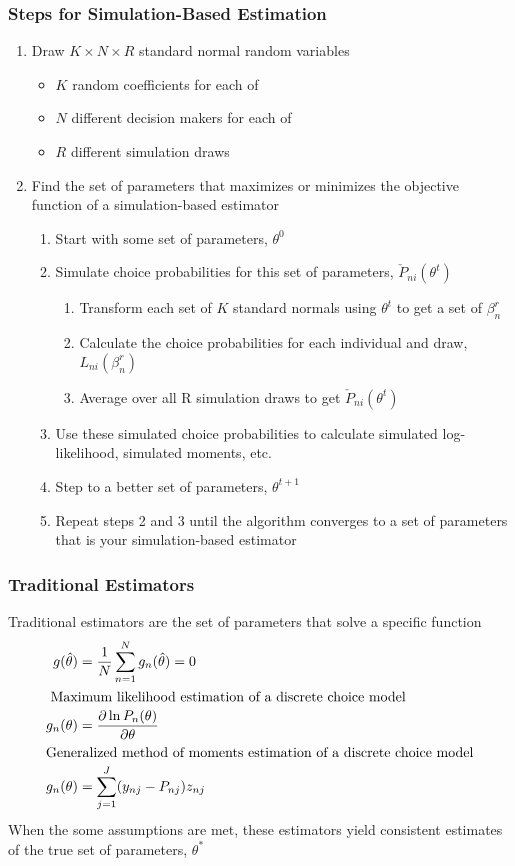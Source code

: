 \documentclass{beamer}
\begin{document}
\begin{frame}\frametitle{Steps for Simulation-Based Estimation}
    \begin{enumerate}
        \item Draw $K \times N \times R$ standard normal random variables
        \begin{itemize}
            \item $K$ random coefficients for each of
            \item $N$ different decision makers for each of
            \item $R$ different simulation draws
        \end{itemize}
        \item Find the set of parameters that maximizes or minimizes the objective function of a simulation-based estimator
        \begin{enumerate}
            \item Start with some set of parameters, $\theta^0$
            \item Simulate choice probabilities for this set of parameters, $\check{P}_{ni}(\theta^t)$
            \begin{enumerate}
                \item Transform each set of $K$ standard normals using $\theta^t$ to get a set of $\beta_n^r$
                \item Calculate the choice probabilities for each individual and draw, $L_{ni}(\beta_n^r)$
                \item Average over all R simulation draws to get $\check{P}_{ni}(\theta^t)$
            \end{enumerate}
            \item Use these simulated choice probabilities to calculate simulated log-likelihood, simulated moments, etc.
            \item Step to a better set of parameters, $\theta^{t + 1}$
            \item Repeat steps 2 and 3 until the algorithm converges to a set of parameters that is your simulation-based estimator
        \end{enumerate}
    \end{enumerate}
\end{frame}

\begin{frame}\frametitle{Traditional Estimators}
    Traditional estimators are the set of parameters that solve a specific function
    \begin{align*}
        g(\hat{\theta}) &= \frac{1}{N} \sum_{n = 1}^N g_n(\hat{\theta}) = 0 \\
        \intertext{ Maximum likelihood estimation of a discrete choice model}
        g_n(\theta) &= \frac{\partial \ln P_n(\theta)}{\partial \theta} \\
        \intertext{Generalized method of moments estimation of a discrete choice model}
        g_n(\theta) &= \sum_{j = 1}^J (y_{nj} - P_{nj}) z_{nj}
    \end{align*}
    When the some assumptions are met, these estimators yield consistent estimates of the true set of parameters, $\theta^*$
\end{frame}
\end{document}
